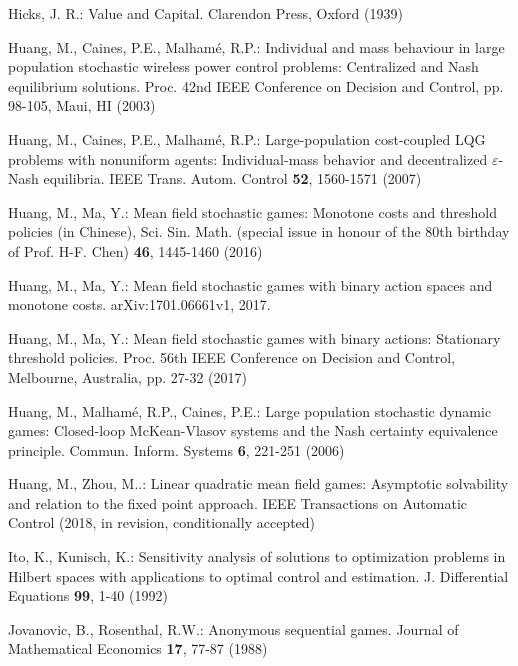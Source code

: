 \begin{thebibliography}{99.}
Hicks, J. R.:  Value and Capital.  Clarendon Press, Oxford
 (1939)




Huang, M., Caines, P.E., Malham\'e, R.P.: Individual and mass
behaviour in large population stochastic wireless power control
problems: Centralized and Nash equilibrium solutions. Proc.
42nd IEEE Conference on Decision and Control, pp. 98-105,  Maui, HI (2003)



Huang, M., Caines, P.E., Malham\'e, R.P.: Large-population
cost-coupled LQG problems with nonuniform agents: Individual-mass
behavior and decentralized $\varepsilon$-Nash equilibria. IEEE
Trans. Autom. Control \textbf{52}, 1560-1571 (2007)





Huang, M., Ma, Y.: Mean field stochastic games: Monotone costs
and threshold policies (in Chinese), Sci. Sin. Math. (special issue in
honour of the 80th birthday of Prof. H-F. Chen) \textbf{46}, 1445-1460 (2016)


Huang, M., Ma, Y.: Mean field stochastic games with binary action
spaces and monotone costs. arXiv:1701.06661v1, 2017.

Huang, M., Ma, Y.:
Mean field stochastic games with binary actions: Stationary threshold policies.
Proc. 56th IEEE Conference on Decision and Control, Melbourne, Australia,  pp. 27-32 (2017)


Huang, M., Malham\'e, R.P., Caines, P.E.: Large population stochastic dynamic games: Closed-loop McKean-Vlasov systems and the Nash certainty equivalence principle. Commun.  Inform.  Systems \textbf{6}, 221-251 (2006)


Huang, M., Zhou, M..: Linear quadratic mean field games: Asymptotic solvability and relation to the fixed point approach.  IEEE Transactions on Automatic Control (2018, in revision, conditionally accepted)



Ito, K., Kunisch, K.: Sensitivity analysis of solutions to optimization problems in Hilbert spaces with applications
to optimal control and estimation. J. Differential Equations \textbf{99}, 1-40 (1992)


Jovanovic, B., Rosenthal, R.W.: Anonymous
sequential games. Journal of Mathematical Economics \textbf{17}, 77-87 (1988)





\end{thebibliography}
